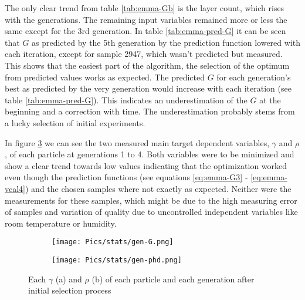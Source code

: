 The only clear trend from table \ref{tab:emma-Gb} is the layer count, which rises with the generations. 
The remaining input variables remained more or less the same except for the 3rd generation. 
%
In table \ref{tab:emma-pred-G} it can be seen that $G$ as predicted 
by the 5th generation by the prediction function lowered with each iteration, 
except for sample 2947, which wasn't predicted but measured. 
This shows that the easiest part of the algorithm, the selection of the optimum 
from predicted values works as expected. 
%
The predicted $G$ for each generation's best as predicted 
by the very generation would increase with each iteration (see table \ref{tab:emma-pred-G}). 
This indicates an underestimation of the $G$ at the beginning and a correction with time. 
The underestimation probably stems from a lucky selection of initial experiments. 

In figure \ref{fig:emma-gen} we can see the two measured main target dependent variables, $\gamma$ and $\rho$, of each particle at generations 1 to 4. 
Both variables were to be minimized and show a clear trend towards low values indicating 
that the optimization worked even though 
the prediction functions (see equations \ref{eq:emma-G3} - \ref{eq:emma-vcal4}) 
and the chosen samples where not exactly as expected. 
Neither were the measurements for these samples, which might be due to the high measuring error of samples and variation of quality due to uncontrolled independent variables like room temperature or humidity. 

\begin{figure}[hb]
    \centering
    \begin{subfigure}{.45\textwidth}
        \centering
        \texttt{[image: Pics/stats/gen-G.png]}
        \caption{} \label{fig:emma-G-gen}
    \end{subfigure}
    \begin{subfigure}{.45\textwidth}
        \centering
        \texttt{[image: Pics/stats/gen-phd.png]}
        \caption{} \label{fig:emma-phd-gen}
    \end{subfigure}
    \caption{Each $\gamma$ (a) and $\rho$ (b) of each particle and each generation after initial selection process} 
    \label{fig:emma-gen}
\end{figure}

